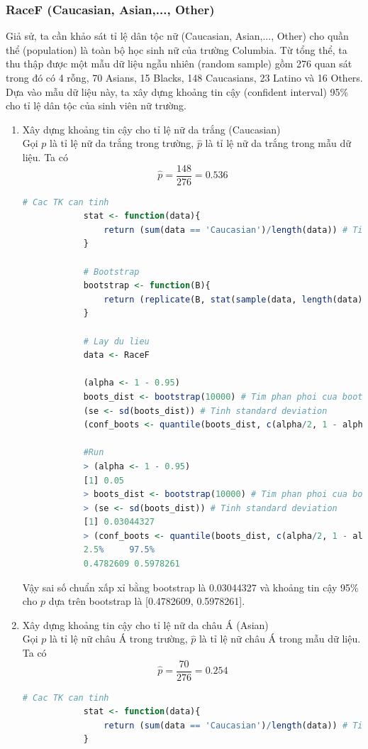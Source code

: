 \documentclass[a4paper,12pt]{article}
\begin{document}
	\subsubsection{RaceF (Caucasian, Asian,..., Other)}
	Giả sử, ta cần khảo sát tỉ lệ dân tộc nữ (Caucasian, Asian,..., Other) cho quần thể (population) là toàn bộ học sinh nữ của trường Columbia. Từ tổng thể, ta thu thập được một mẫu dữ liệu ngẫu nhiên (random sample) gồm 276 quan sát trong đó có 4 rỗng, 70 Asians, 15 Blacks, 148 Caucasians, 23 Latino và 16 Others. Dựa vào mẫu dữ liệu này, ta xây dựng khoảng tin cậy (confident interval) 95\% cho tỉ lệ dân tộc của sinh viên nữ trường.
	\begin{enumerate}[label = \alph*)]
		\item Xây dựng khoảng tin cậy cho tỉ lệ nữ da trắng (Caucasian)\\
		
		Gọi $p$ là tỉ lệ nữ da trắng trong trường, $\hat{p}$ là tỉ lệ nữ da trắng trong mẫu dữ liệu. Ta có
		$$\hat{p} = \frac{148}{276} = 0.536$$
			\begin{lstlisting}[language=R]
			# Cac TK can tinh
			stat <- function(data){
				return (sum(data == 'Caucasian')/length(data)) # Ti le
			}
			
			# Bootstrap
			bootstrap <- function(B){
				return (replicate(B, stat(sample(data, length(data), replace = TRUE))))
			}
			
			# Lay du lieu
			data <- RaceF
			
			(alpha <- 1 - 0.95)
			boots_dist <- bootstrap(10000) # Tim phan phoi cua bootstrap
			(se <- sd(boots_dist)) # Tinh standard deviation
			(conf_boots <- quantile(boots_dist, c(alpha/2, 1 - alpha/2))) # Tim khoang tin cay cho p
			
			#Run
			> (alpha <- 1 - 0.95)
			[1] 0.05
			> boots_dist <- bootstrap(10000) # Tim phan phoi cua bootstrap
			> (se <- sd(boots_dist)) # Tinh standard deviation
			[1] 0.03044327
			> (conf_boots <- quantile(boots_dist, c(alpha/2, 1 - alpha/2))) # Tim khoang tin cay cho p
			2.5%     97.5% 
			0.4782609 0.5978261
			\end{lstlisting}
			Vậy sai số chuẩn xấp xỉ bằng bootstrap là 0.03044327 và khoảng tin cậy 95\% cho $p$ dựa trên bootstrap
			là [0.4782609, 0.5978261].
		\item Xây dựng khoảng tin cậy cho tỉ lệ nữ da châu Á (Asian)\\
		
		Gọi $p$ là tỉ lệ nữ châu Á trong trường, $\hat{p}$ là tỉ lệ nữ châu Á trong mẫu dữ liệu. Ta có
		$$\hat{p} = \frac{70}{276} = 0.254$$
			\begin{lstlisting}[language=R]
			# Cac TK can tinh
			stat <- function(data){
				return (sum(data == 'Caucasian')/length(data)) # Ti le
			}
			

\end{lstlisting}
\end{enumerate}
\end{document}
